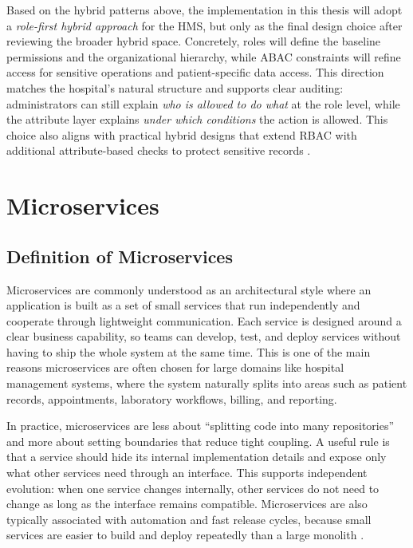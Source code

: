 Based on the hybrid patterns above, the implementation in this thesis will adopt a \emph{role-first hybrid approach} for the HMS, but only as the final design choice after reviewing the broader hybrid space. Concretely, roles will define the baseline permissions and the organizational hierarchy, while ABAC constraints will refine access for sensitive operations and patient-specific data access. This direction matches the hospital’s natural structure and supports clear auditing: administrators can still explain \emph{who is allowed to do what} at the role level, while the attribute layer explains \emph{under which conditions} the action is allowed. This choice also aligns with practical hybrid designs that extend RBAC with additional attribute-based checks to protect sensitive records \cite{KuhnCoyneWeil2010,Penelova2021HRABAC}.




\section{Microservices}
\label{sec:microservices}

\subsection{Definition of Microservices}
\label{sec:microservices-definition}
Microservices are commonly understood as an architectural style where an application is built as a set of small services that run independently and cooperate through lightweight communication. Each service is designed around a clear business capability, so teams can develop, test, and deploy services without having to ship the whole system at the same time. This is one of the main reasons microservices are often chosen for large domains like hospital management systems, where the system naturally splits into areas such as patient records, appointments, laboratory workflows, billing, and reporting.
\vspace{0.5cm}

In practice, microservices are less about “splitting code into many repositories” and more about setting boundaries that reduce tight coupling. A useful rule is that a service should hide its internal implementation details and expose only what other services need through an interface. This supports independent evolution: when one service changes internally, other services do not need to change as long as the interface remains compatible. Microservices are also typically associated with automation and fast release cycles, because small services are easier to build and deploy repeatedly than a large monolith \cite{BaresiGarriga2020,AbdelfattahCerny2022}.

